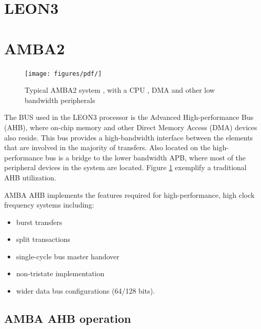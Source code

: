 \section{LEON3}

\section{AMBA2}
\begin{figure}[ht]
    \centering
    \texttt{[image: figures/pdf/]}
    \caption{Typical AMBA2 system , with a CPU , DMA and other low bandwidth peripherals }
    \label{fig:general}
\end{figure}

The BUS used in the LEON3 processor is the Advanced High-performance Bus (AHB), where on-chip memory and other Direct Memory Access (DMA) devices also reside. This bus provides a high-bandwidth interface between the elements that are involved in the majority of transfers. Also located on the high-performance bus is a bridge to the lower bandwidth APB, where most of the peripheral devices in the system are located. Figure \ref{fig:general} exemplify a traditional AHB utilization.


AMBA AHB implements the features required for high-performance, high clock
frequency systems including:
\begin{itemize}
 \item {burst transfers}
\item {split transactions}
\item {single-cycle bus master handover}
\item {non-tristate implementation}
\item {wider data bus configurations (64/128 bits).}
\end{itemize}

 
\subsection{AMBA AHB operation}

